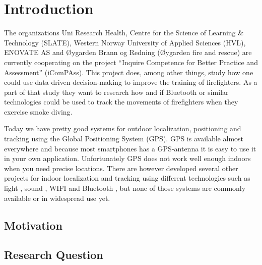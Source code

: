 \documentclass[../Main/thesis.tex]{subfiles}
\begin{document}
\chapter{Introduction}
\label{ch:introduction}

The organizations Uni Research Health, Centre for the Science of Learning \& Technology (SLATE), Western Norway University of Applied Sciences (HVL), ENOVATE AS and Øygarden Brann og Redning (Øygarden fire and rescue) are currently cooperating on the project ``Inquire Competence for Better Practice and Assessment'' (iComPAss).
This project does, among other things, study how one could use data driven decision-making to improve the training of firefighters.
As a part of that study they want to research how and if Bluetooth or similar technologies could be used to track the movements of firefighters when they exercise smoke diving.
 
Today we have pretty good systems for outdoor localization, positioning and tracking using the Global Positioning System (GPS). 
GPS is available almost everywhere and because most smartphones has a GPS-antenna it is easy to use it in your own application. 
Unfortunately GPS does not work well enough indoors when you need precise locations.
There are however developed several other projects for indoor localization and tracking using different technologies such as light \citep{xiaohan2010improved}, sound \citep{schweinzer2010ultrasonic}, WIFI  \citep{chang2010robust} and Bluetooth , but none of those systems are commonly available or in widespread use yet.


\section{Motivation}



\section{Research Question}




\onlyinsubfile{}
\onlyinsubfile{}
\end{document}
